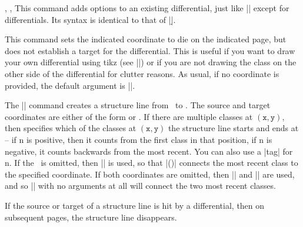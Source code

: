 \begin{sseqdata}[name = basic, cohomological Serre grading]
\begin{commandlist}{
    {\doptions\moptions{}},
    {\doptions\moptions{}\pars{\sourcename\opt{,\targetn}}},
    {\doptions\moptions{}\pars{\sourcecoord}\pars{\targetcoord}}%
}%
This command adds options to an existing differential, just like |\classoptions|
except for differentials. Its syntax is identical to that of |\d|.
\end{commandlist}

\begin{command}{\kill{}} This command sets the indicated
coordinate to die on the indicated page, but does not establish a target for the
differential. This is useful if you want to draw your own differential using
tikz (see |\getdtarget|) or if you are not drawing the class on the other side
of the differential for clutter reasons. As usual, if no coordinate is provided,
the default argument is |\lastclass|.
\end{command}

\begin{command}{\structline\ooptions\opt{\pars{\sourcecoord}\pars{\targetcoord}}}
The |\structline| command creates a structure line from \sourcecoord\  to
\targetcoord. The source and target coordinates are either of the form
 or . If there are
multiple classes at $\mathtt{(x,y)}$, then  specifies which of the
classes at $\mathtt{(x,y)}$ the structure line starts and ends at -- if n is
positive, then it counts from the first class in that position, if n is
negative, it counts backwards from the most recent. You can also use a |tag| for
n. If the \targetcoord\ is omitted, then |\lastclass| is used, so that
|\structline(\sourcecoord)| connects the most recent class to the specified
coordinate. If both coordinates are omitted, then |\lastclass| and ||
are used, and so |\structline| with no arguments at all will connect the two
most recent classes.

If the source or target of a structure line is hit by a differential, then on
subsequent pages, the structure line disappears.


\end{command}
\end{sseqdata}
